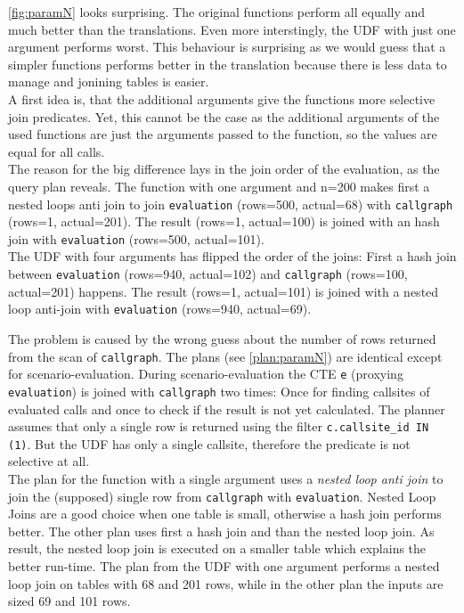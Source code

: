 \autoref{fig:paramN} looks surprising. The original functions perform all equally and much better than the translations. Even more interstingly, the UDF with just one argument performs worst. This behaviour is surprising as we would guess that a simpler functions performs better in the translation because there is less data to manage and jonining tables is easier.\\
A first idea is, that the additional arguments give the functions more selective join predicates. Yet, this cannot be the case as the additional arguments of the used functions are just the arguments passed to the function, so the values are equal for all calls.\\
The reason for the big difference lays in the join order of the evaluation, as the query plan reveals. The function with one argument and n=200 makes first a nested loops anti join to join \texttt{evaluation} (rows=500, actual=68) with \texttt{callgraph} (rows=1, actual=201). The result (rows=1, actual=100) is joined with an hash join with \texttt{evaluation} (rows=500, actual=101).\\
The UDF with four arguments has flipped the order of the joins: First a hash join between \texttt{evaluation} (rows=940, actual=102) and \texttt{callgraph} (rows=100, actual=201) happens. The result (rows=1, actual=101) is joined with a nested loop anti-join with \texttt{evaluation} (rows=940, actual=69).

The problem is caused by the wrong guess about the number of rows returned from the scan of \texttt{callgraph}. The plans (see \autoref{plan:paramN}) are identical except for scenario-evaluation. During scenario-evaluation the CTE \texttt{e} (proxying \texttt{evaluation}) is joined with \texttt{callgraph} two times: Once for finding callsites of evaluated calls and once to check if the result is not yet calculated. The planner assumes that only a single row is returned using the filter \texttt{c.callsite\_id IN (1)}. But the UDF has only a single callsite, therefore the predicate is not selective at all.\\
The plan for the function with a single argument uses a \textit{nested loop anti join} to join the (supposed) single row from \texttt{callgraph} with \texttt{evaluation}. Nested Loop Joins are  a good choice when one table is small, otherwise a hash join performs better. The other plan uses first a hash join and than the nested loop join. As result, the nested loop join is executed on a smaller table which explains the better run-time. The plan from the UDF with one argument performs a nested loop join on tables with 68 and 201 rows, while in the other plan the inputs are sized 69 and 101 rows.

